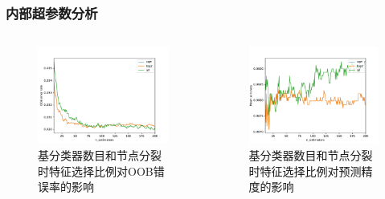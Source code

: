 \documentclass[10pt,aspectratio=43,mathserif]{beamer}
\begin{document}
        \begin{frame}
            \frametitle{\textbf{内部超参数分析}}
              \begin{columns}
                  \begin{figure}
                      \centering
                      \includegraphics[width=1\textwidth]{figures/hyperpara_max_features_oob_2.pdf}
                      \caption{基分类器数目和节点分裂时特征选择比例对OOB错误率的影响}
                  \end{figure}
  
                  \begin{figure}
                      \centering
                      \includegraphics[width=1\textwidth]{figures/hyperpara_max_features_mean_acc_2.pdf}
                      \caption{基分类器数目和节点分裂时特征选择比例对预测精度的影响}
                  \end{figure}
              \end{columns}
          \end{frame}
\end{document}
